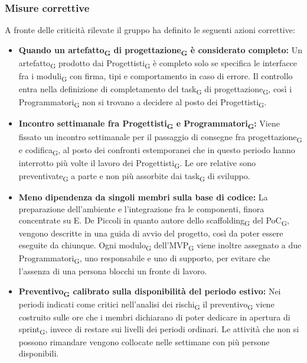 ﻿\documentclass[a4paper, 10pt, colorlinks=true, linkcolor=black, urlcolor=blue, citecolor=blue, hidelinks]{article}
\begin{document}
\subsubsection{Misure correttive}
A fronte delle criticità rilevate il gruppo ha definito le seguenti azioni correttive:
\begin{itemize}
    \item \textbf{Quando un artefatto\textsubscript{G} di progettazione\textsubscript{G} è considerato completo:} Un artefatto\textsubscript{G} prodotto dai Progettisti\textsubscript{G} è completo solo se specifica le interfacce fra i moduli\textsubscript{G} con firma, tipi e comportamento in caso di errore. Il controllo entra nella definizione di completamento del task\textsubscript{G} di progettazione\textsubscript{G}, così i Programmatori\textsubscript{G} non si trovano a decidere al posto dei Progettisti\textsubscript{G}.

    \item \textbf{Incontro settimanale fra Progettisti\textsubscript{G} e Programmatori\textsubscript{G}:} Viene fissato un incontro settimanale per il passaggio di consegne fra progettazione\textsubscript{G} e codifica\textsubscript{G}, al posto dei confronti estemporanei che in questo periodo hanno interrotto più volte il lavoro dei Progettisti\textsubscript{G}. Le ore relative sono preventivate\textsubscript{G} a parte e non più assorbite dai task\textsubscript{G} di sviluppo.

    \item \textbf{Meno dipendenza da singoli membri sulla base di codice:} La preparazione dell'ambiente e l'integrazione fra le componenti, finora concentrate su E. De Piccoli in quanto autore dello scaffolding\textsubscript{G} del PoC\textsubscript{G}, vengono descritte in una guida di avvio del progetto, così da poter essere eseguite da chiunque. Ogni modulo\textsubscript{G} dell'MVP\textsubscript{G} viene inoltre assegnato a due Programmatori\textsubscript{G}, uno responsabile e uno di supporto, per evitare che l'assenza di una persona blocchi un fronte di lavoro.

    \item \textbf{Preventivo\textsubscript{G} calibrato sulla disponibilità del periodo estivo:} Nei periodi indicati come critici nell'analisi dei rischi\textsubscript{G} il preventivo\textsubscript{G} viene costruito sulle ore che i membri dichiarano di poter dedicare in apertura di sprint\textsubscript{G}, invece di restare sui livelli dei periodi ordinari. Le attività che non si possono rimandare vengono collocate nelle settimane con più persone disponibili.


\end{itemize}
\end{document}
